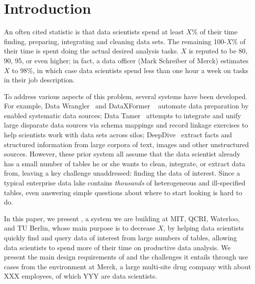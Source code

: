 \section{Introduction}
\label{introduction}

An often cited statistic is that data scientists spend at least
$X$\% of their time finding, preparing, integrating and cleaning data sets.
The remaining 100-$X$\% of their time is spent doing the actual desired analysis
tasks.  $X$ is reputed to be 80, 90, 95, or even higher;  in fact,  
a data officer (Mark Schreiber
of Merck) estimates $X$ to 98\%, in which case data
scientists spend less than one hour a week on tasks in their job description.


To address various aspects of this problem, several systems have been developed.  For example, 
  Data Wrangler~\cite{2011-wrangler} and DataXFormer ~\cite{DBLP:conf/icde/AbedjanMIOPS16} automate data preparation by enabled systematic data sources; 
Data Tamer~\cite{DBLP:conf/cidr/StonebrakerBIBCZPX13} attempts to integrate and unify large disparate data sources via schema mappings and record linkage exercises to help scientists work with data sets across silos; 
DeepDive~\cite{DBLP:journals/pvldb/ShinWWSZR15} extract facts and structured information from large corpora of text, images and other unstructured sources.
However, these prior system all assume that the
data scientist already has a small number of tables he or she wants to clean, integrate, or extract data from, leaving a key challenge unaddressed: finding the data of interest.  Since a typical enterprise data lake contains {\it thousands} of heterogeneous and ill-specified tables, even answering simple questions about where to start looking is hard to do.  

In this paper, we present 
\dcv, a system we are building
at MIT, QCRI, Waterloo, and TU Berlin, whose main purpose  is to decrease $X$, by helping data scientists quickly find and query data of interest from large numbers of tables, allowing 
data scientists to spend more of their time on productive data analysis.  We present the main  design requirements of \dcv and the challenges it entails through use cases from the environment at Merck,  a large multi-site drug company with about XXX employees, of which YYY are data scientists.


